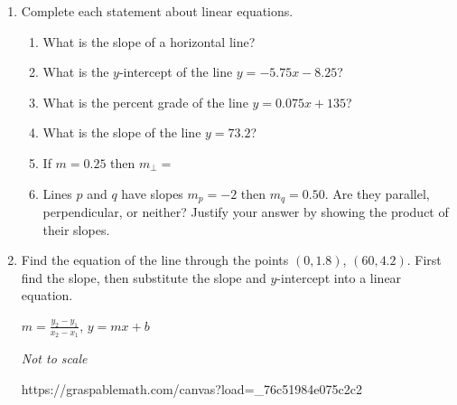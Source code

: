 \begin{enumerate}
\item Complete each statement about linear equations.
\begin{enumerate}[itemsep=0.5cm]
  \item What is the slope of a horizontal line?
  \item What is the $y$-intercept of the line $y = -5.75x - 8.25$?
  \item What is the percent grade of the line $\displaystyle y = 0.075x + 135$?
  \item What is the slope of the line $y=73.2$?
  \item If $m = 0.25$ then $m_{\perp}=$
  \item Lines $p$ and $q$ have slopes $m_p = -2$ then $m_q= 0.50$. Are they parallel, perpendicular, or neither? Justify your answer by showing the product of their slopes.
  \end{enumerate}

\item Find the equation of the line through the points $(0,1.8)$, $(60,4.2)$. First find the slope, then substitute the slope and $y$-intercept into a linear equation.
\begin{multicols}{2}
  $\displaystyle m = \frac{y_2 - y_1}{x_2 - x_1}$, \hspace{1cm} $y=mx+b$
  \columnbreak
  \begin{flushright}
    \emph{Not to scale}\\
    https://graspablemath.com/canvas?load=\_76c51984e075c2c2 %
    \end{flushright}
  \end{multicols}


\end{enumerate}
